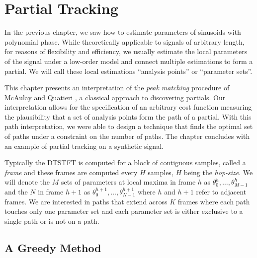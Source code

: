 \chapter{Partial Tracking\label{chap:partialtracking}}

In the previous chapter, we saw how to estimate parameters of sinusoids with
polynomial phase. While theoretically applicable to signals of arbitrary length,
for reasons of flexibility and efficiency, we usually estimate the local
parameters of the signal under a low-order model and connect multiple
estimations to form a partial. We will call these local estimations ``analysis
points'' or ``parameter sets''.

This chapter presents an interpretation of the \textit{peak matching} procedure
of McAulay and Quatieri \cite{mcaulay1986speech}, a classical approach to discovering partials. Our
interpretation allows for the specification of an arbitrary cost function
measuring the plausibility that a set of analysis points form the path of a
partial. With this path interpretation, we were able to design a technique that finds the
optimal set of paths under a constraint on the number of paths. The chapter
concludes with an example of partial tracking on a synthetic signal.

Typically the DTSTFT is computed for a block of contiguous samples, called a
\textit{frame} and these frames are computed every $H$ samples, $H$ being the
\textit{hop-size}. We will denote the $M$ sets of parameters at local maxima in
frame $h$ as $\theta_0^{h}, \dotsc, \theta_{M-1}^{h}$ and the $N$ in frame $h+1$
as $\theta_0^{h+1}, \dotsc, \theta_{N-1}^{h+1}$ where $h$ and $h+1$ refer to
adjacent frames. We are interested in paths that extend across $K$ frames where
each path touches only one parameter set and each parameter set is either
exclusive to a single path or is not on a path.


\section{A Greedy Method}

